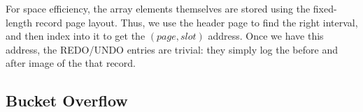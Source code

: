 \documentclass[10pt,letterpaper,twocolumn,english]{article}
\newcommand{\yad}{Lemon\xspace}
\newcommand{\eab}[1]{\textcolor{red}{\bf EAB: #1}}
\newcommand{\rcs}[1]{\textcolor{green}{\bf RCS: #1}}
\begin{document}
For space efficiency, the array elements themselves are stored using
the fixed-length record page layout. Thus, we use the header page to
find the right interval, and then index into it to get the $(page,
slot)$ address.  Once we have this address, the REDO/UNDO entries are
trivial: they simply log the before and after image of the that
record.






\subsection{Bucket Overflow}

%
\end{document}
